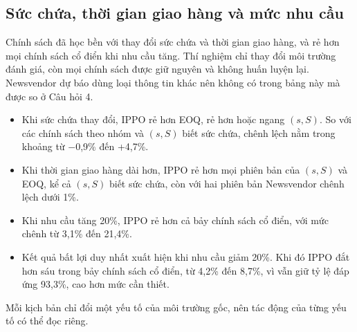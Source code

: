 \subsection{Sức chứa, thời gian giao hàng và mức nhu cầu}
\label{subsec:doBenMoiTruong}

Chính sách đã học bền với thay đổi sức chứa và thời gian giao hàng, và rẻ hơn mọi chính sách cổ điển khi nhu cầu tăng. Thí nghiệm chỉ thay đổi môi trường đánh giá, còn mọi chính sách được giữ nguyên và không huấn luyện lại. Newsvendor dự báo dùng loại thông tin khác nên không có trong bảng này mà được so ở Câu hỏi 4.
\begin{itemize}
    \item Khi sức chứa thay đổi, IPPO rẻ hơn EOQ, rẻ hơn hoặc ngang $(s,S)$. So với các chính sách theo nhóm và $(s,S)$ biết sức chứa, chênh lệch nằm trong khoảng từ $-$0,9\% đến +4,7\%.
    \item Khi thời gian giao hàng dài hơn, IPPO rẻ hơn mọi phiên bản của $(s,S)$ và EOQ, kể cả $(s,S)$ biết sức chứa, còn với hai phiên bản Newsvendor chênh lệch dưới 1\%.
    \item Khi nhu cầu tăng 20\%, IPPO rẻ hơn cả bảy chính sách cổ điển, với mức chênh từ 3,1\% đến 21,4\%.
    \item Kết quả bất lợi duy nhất xuất hiện khi nhu cầu giảm 20\%. Khi đó IPPO đắt hơn sáu trong bảy chính sách cổ điển, từ 4,2\% đến 8,7\%, vì vẫn giữ tỷ lệ đáp ứng 93,3\%, cao hơn mức cần thiết.
\end{itemize}

Mỗi kịch bản chỉ đổi một yếu tố của môi trường gốc, nên tác động của từng yếu tố có thể đọc riêng.

